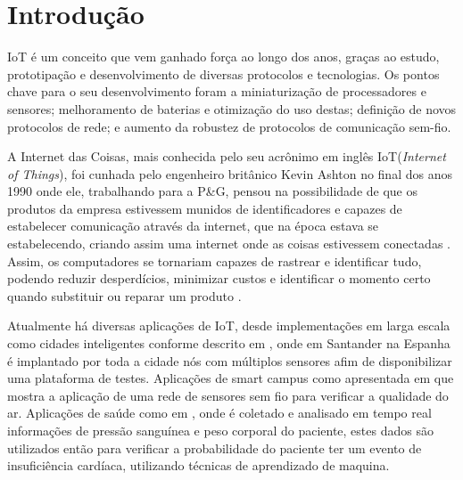 \chapter[Introdução]{Introdução}
\label{cap:intro}

IoT é um conceito que vem ganhado força ao longo dos anos, graças ao estudo, prototipação e desenvolvimento de diversas protocolos e tecnologias. Os pontos chave para o seu desenvolvimento foram a miniaturização de processadores e sensores; melhoramento de baterias e otimização do uso destas; definição de novos protocolos de rede; e aumento da robustez de protocolos de comunicação sem-fio.

A Internet das Coisas, mais conhecida pelo seu acrônimo em inglês IoT(\textit{Internet of Things}), foi cunhada pelo engenheiro britânico Kevin Ashton no final dos anos 1990 onde ele, trabalhando para a P\&G, pensou na possibilidade de que os produtos da empresa estivessem munidos de identificadores e capazes de estabelecer comunicação através da internet, que na época estava se estabelecendo, criando assim uma internet onde as coisas estivessem conectadas \cite{KA_IOT}. Assim, os computadores se tornariam capazes de rastrear e identificar tudo, podendo reduzir desperdícios, minimizar custos e identificar o momento certo quando substituir ou reparar um produto \cite{lopezIOT}.


Atualmente há diversas aplicações de IoT, desde implementações em larga escala como cidades inteligentes conforme descrito em \cite{sotres2017practical}, onde em Santander na Espanha é implantado por toda a cidade nós com múltiplos sensores afim de disponibilizar uma plataforma de testes. Aplicações de smart campus como apresentada em \cite{wang2017performance} que mostra a aplicação de uma rede de sensores sem fio para verificar a qualidade do ar. Aplicações de saúde como em \cite{zhang2015remote}, onde é coletado e analisado em tempo real informações de pressão sanguínea e peso corporal do paciente, estes dados são utilizados então para verificar a probabilidade do paciente ter um evento de insuficiência cardíaca, utilizando técnicas de aprendizado de maquina.


